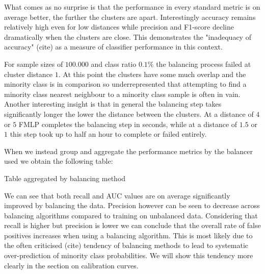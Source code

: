 What comes as no surprise is that the performance in every standard metric is on average better, the further the clusters are apart. 
Interestingly accuracy remains relatively high even for low distances while precision and F1-score decline dramatically when the clusters are close.
This demonstrates the "inadequacy of accuracy" (cite) as a measure of classifier performance in this context.

For sample sizes of $100.000$ and class ratio $0.1\%$ the balancing process failed at cluster distance $1$. 
At this point the clusters have some much overlap and the minority class is in comparison so underrepresented 
that attempting to find a minority class nearest neighbour to a minority class sample is often in vain.
Another interesting insight is that in general the balancing step takes significantly longer the lower the distance between the clusters.
At a distance of $4$ or $5$ FMLP completes the balancing step in seconds, while at a distance of $1.5$ or $1$ this step took up to half an hour to complete or failed entirely.

When we instead group and aggregate the performance metrics by the balancer used we obtain the following table:

\begin{table}[H]
\centering
\caption{Table aggregated by balancing method}
\end{table}

We can see that both recall and AUC values are on average significantly improved by balancing the data.
Precision however can be seen to decrease across balancing algorithms compared to training on unbalanced data.
Considering that recall is higher but precision is lower we can conclude that the overall rate of false positives increases when using a balancing algorithm.
This is most likely due to the often criticised (cite) tendency of balancing methods to lead to systematic over-prediction of minority class probabilities.
We will show this tendency more clearly in the section on calibration curves.

